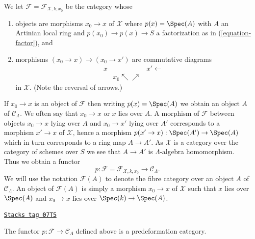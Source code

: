 \medskip\noindent
We let $\mathcal{F} = \mathcal{F}_{\mathcal{X}, k, x_0}$ be the
category whose
\begin{enumerate}
\item objects are morphisms $x_0 \to x$ of $\mathcal{X}$ where
$p(x) = \Spec(A)$ with $A$ an Artinian local ring and
$p(x_0) \to p(x) \to S$ a factorization as in (\ref{equation-factor}), and
\item morphisms $(x_0 \to x) \to (x_0 \to x')$ are commutative
diagrams
$$
\begin{array}{ccc}x &  & x' \longleftarrow \\  & x_0 \nwarrow\nearrow & \end{array}
$$
in $\mathcal{X}$. (Note the reversal of arrows.)
\end{enumerate}
If $x_0 \to x$ is an object of $\mathcal{F}$ then writing $p(x) = \Spec(A)$
we obtain an object $A$ of $\mathcal{C}_\Lambda$. We often say that
$x_0 \to x$ or $x$ lies over $A$. A morphism of $\mathcal{F}$ between objects
$x_0 \to x$ lying over $A$ and $x_0 \to x'$ lying over $A'$
corresponds to a morphism $x' \to x$ of $\mathcal{X}$, hence a morphism
$p(x' \to x) : \Spec(A') \to \Spec(A)$ which in turn corresponds to a
ring map $A \to A'$. As $\mathcal{X}$ is a category
over the category of schemes over $S$ we see that $A \to A'$ is
$\Lambda$-algebra homomorphism. Thus we obtain a functor
\begin{equation}
\label{equation-predeformation-category}
p : \mathcal{F} = \mathcal{F}_{\mathcal{X}, k, x_0}
\longrightarrow
\mathcal{C}_\Lambda.
\end{equation}
We will use the notation $\mathcal{F}(A)$ to denote the fibre category
over an object $A$ of $\mathcal{C}_\Lambda$. An object of $\mathcal{F}(A)$
is simply a morphism $x_0 \to x$ of $\mathcal{X}$ such that
$x$ lies over $\Spec(A)$ and $x_0 \to x$ lies over $\Spec(k) \to \Spec(A)$.

\begin{lemma}
\label{artin-lemma-predeformation-category}
\href{https://stacks.math.columbia.edu/tag/07T5}{\texttt{Stacks tag 07T5}}

The functor $p : \mathcal{F} \to \mathcal{C}_\Lambda$ defined above
is a predeformation category.
\end{lemma}

